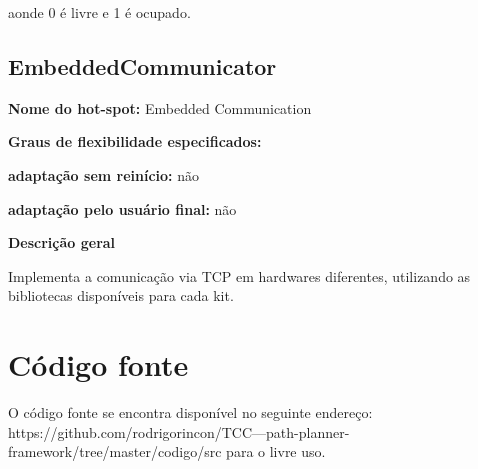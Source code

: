 \begin{anexosenv}
aonde 0 é livre e 1 é ocupado.

\section{EmbeddedCommunicator}

{\large \textbf{Nome do hot-spot:}} Embedded Communication

{\large \textbf{Graus de flexibilidade especificados:}}

\textbf{adaptação sem reinício:} não

\textbf{adaptação pelo usuário final:} não

{\large \textbf{Descrição geral}}

Implementa a comunicação via TCP em hardwares diferentes, utilizando as bibliotecas disponíveis para cada kit.

\chapter{Código fonte}

O código fonte se encontra disponível no seguinte endereço: https://github.com/rodrigorincon/TCC---path-planner-framework/tree/master/codigo/src para o livre uso.

\end{anexosenv}

